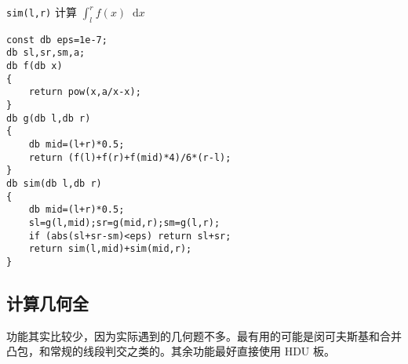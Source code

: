 \documentclass[12pt]{ctexart}
\newcommand*{\dif}{\mathop{}\!\mathrm{d}}
\begin{document}
\verb|sim(l,r)| 计算 $\int_l^r f(x)\dif x$

\begin{lstlisting}
const db eps=1e-7;
db sl,sr,sm,a;
db f(db x)
{
	return pow(x,a/x-x);
}
db g(db l,db r)
{
	db mid=(l+r)*0.5;
	return (f(l)+f(r)+f(mid)*4)/6*(r-l);
}
db sim(db l,db r)
{
	db mid=(l+r)*0.5;
	sl=g(l,mid);sr=g(mid,r);sm=g(l,r);
	if (abs(sl+sr-sm)<eps) return sl+sr;
	return sim(l,mid)+sim(mid,r);
}
\end{lstlisting}

\subsection{计算几何全}

功能其实比较少，因为实际遇到的几何题不多。最有用的可能是闵可夫斯基和合并凸包，和常规的线段判交之类的。其余功能最好直接使用 HDU 板。
\end{document}

